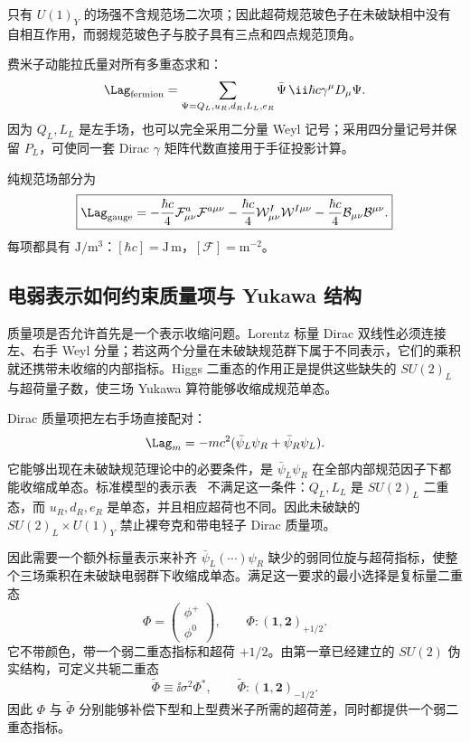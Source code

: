 只有 $U(1)_Y$ 的场强不含规范场二次项；因此超荷规范玻色子在未破缺相中没有自相互作用，而弱规范玻色子与胶子具有三点和四点规范顶角。

费米子动能拉氏量对所有多重态求和：
\begin{equation}
 \Lag_{\rm fermion}
 =\sum_{\Psi=Q_L,u_R,d_R,L_L,e_R}
 \bar\Psi\,\ii\hbar c\gamma^\mu D_\mu\Psi.
 \label{eq:sm-fermion-kinetic-dp11}
\end{equation}
因为 $Q_L,L_L$ 是左手场，也可以完全采用二分量 Weyl 记号；采用四分量记号并保留 $P_L$，可使同一套 Dirac $\gamma$ 矩阵代数直接用于手征投影计算。

纯规范场部分为
\begin{equation}
 \boxed{
 \Lag_{\rm gauge}
 =-\frac{\hbar c}{4}\mathcal F_{\mu\nu}^a\mathcal F^{a\mu\nu}
 -\frac{\hbar c}{4}\mathcal W_{\mu\nu}^I\mathcal W^{I\mu\nu}
 -\frac{\hbar c}{4}\mathcal B_{\mu\nu}\mathcal B^{\mu\nu}.}
 \label{eq:sm-gauge-lagrangian-dp11}
\end{equation}
每项都具有 $\mathrm{J/m^3}$：$[\hbar c]=\mathrm{J\,m}$，$[\mathcal F]=\mathrm{m^{-2}}$。



\subsection{电弱表示如何约束质量项与 Yukawa 结构}

质量项是否允许首先是一个表示收缩问题。Lorentz 标量 Dirac 双线性必须连接左、右手 Weyl 分量；若这两个分量在未破缺规范群下属于不同表示，它们的乘积就还携带未收缩的内部指标。Higgs 二重态的作用正是提供这些缺失的 $SU(2)_L$ 与超荷量子数，使三场 Yukawa 算符能够收缩成规范单态。

Dirac 质量项把左右手场直接配对：
\begin{equation}
 \Lag_m=-mc^2(\bar\psi_L\psi_R+\bar\psi_R\psi_L).
 \label{eq:dirac-mass-chiral-mixing-dp11}
\end{equation}
它能够出现在未破缺规范理论中的必要条件，是 $\bar\psi_L\psi_R$ 在全部内部规范因子下都能收缩成单态。标准模型的表示表~ 不满足这一条件：$Q_L,L_L$ 是 $SU(2)_L$ 二重态，而 $u_R,d_R,e_R$ 是单态，并且相应超荷也不同。因此未破缺的 $SU(2)_L\times U(1)_Y$ 禁止裸夸克和带电轻子 Dirac 质量项。

因此需要一个额外标量表示来补齐 $\bar\psi_L(\cdots)\psi_R$ 缺少的弱同位旋与超荷指标，使整个三场乘积在未破缺电弱群下收缩成单态。满足这一要求的最小选择是复标量二重态
\begin{equation}
 \boxed{
 \Phi=\begin{pmatrix}\phi^+\\ \phi^0\end{pmatrix},
 \qquad
 \Phi:(\mathbf1,\mathbf2)_{+1/2}.}
 \label{eq:sm-higgs-rep-dp11}
\end{equation}
它不带颜色，带一个弱二重态指标和超荷 $+1/2$。由第一章已经建立的 $SU(2)$ 伪实结构，可定义共轭二重态
\begin{equation*}
 \widetilde\Phi\equiv\ii\sigma^2\Phi^*,
 \qquad
 \widetilde\Phi:(\mathbf1,\mathbf2)_{-1/2}.
\end{equation*}
因此 $\Phi$ 与 $\widetilde\Phi$ 分别能够补偿下型和上型费米子所需的超荷差，同时都提供一个弱二重态指标。

